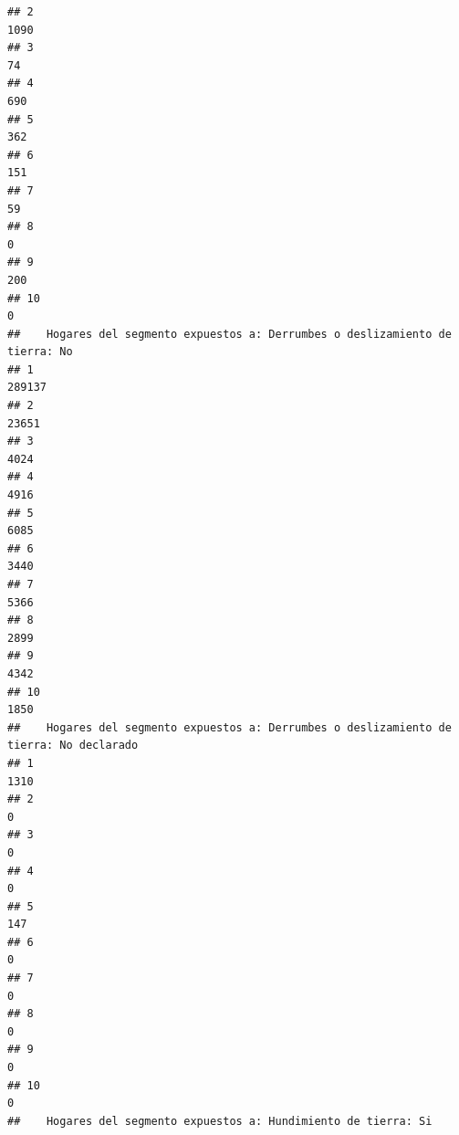 \documentclass[11pt,]{article}
\begin{document}
\begin{verbatim}
## 2                                                                       1090
## 3                                                                         74
## 4                                                                        690
## 5                                                                        362
## 6                                                                        151
## 7                                                                         59
## 8                                                                          0
## 9                                                                        200
## 10                                                                         0
##    Hogares del segmento expuestos a: Derrumbes o deslizamiento de tierra: No
## 1                                                                     289137
## 2                                                                      23651
## 3                                                                       4024
## 4                                                                       4916
## 5                                                                       6085
## 6                                                                       3440
## 7                                                                       5366
## 8                                                                       2899
## 9                                                                       4342
## 10                                                                      1850
##    Hogares del segmento expuestos a: Derrumbes o deslizamiento de tierra: No declarado
## 1                                                                                 1310
## 2                                                                                    0
## 3                                                                                    0
## 4                                                                                    0
## 5                                                                                  147
## 6                                                                                    0
## 7                                                                                    0
## 8                                                                                    0
## 9                                                                                    0
## 10                                                                                   0
##    Hogares del segmento expuestos a: Hundimiento de tierra: Si

\end{verbatim}
\end{document}
